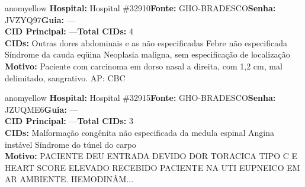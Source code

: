 \documentclass[a4paper,10pt]{article}
\begin{document}
\begin{anomalycard}[Interna\c{c}\~{a}o \#118565 | Pac. \#98367 | MODERADO (z=2.42) | LOS: 2d | 23/02/2026\,$\to$\,25/02/2026]{anomyellow}
\textbf{Hospital:} Hospital \#32910\quad \textbf{Fonte:} GHO-BRADESCO\quad \textbf{Senha:} JVZYQ97\quad \textbf{Guia:} ---\\

\textbf{CID Principal:} {\small ---}\quad\textbf{Total CIDs:} 4\\

\textbf{CIDs:} {\scriptsize Outras dores abdominais e as não especificadas \textbar{} Febre não especificada \textbar{} Síndrome da cauda eqüina \textbar{} Neoplasia maligna, sem especificação de localização}\\

\textbf{Motivo:} {\scriptsize Paciente com carcinoma em dorso nasal a direita, com 1,2 cm, mal delimitado, sangrativo. AP: CBC}\\



\end{anomalycard}


\begin{anomalycard}[Interna\c{c}\~{a}o \#119125 | Pac. \#98791 | MODERADO (z=2.41) | LOS: 2d | 01/03/2026\,$\to$\,03/03/2026]{anomyellow}
\textbf{Hospital:} Hospital \#32915\quad \textbf{Fonte:} GHO-BRADESCO\quad \textbf{Senha:} JZUQME6\quad \textbf{Guia:} ---\\

\textbf{CID Principal:} {\small ---}\quad\textbf{Total CIDs:} 3\\

\textbf{CIDs:} {\scriptsize Malformação congênita não especificada da medula espinal \textbar{} Angina instável \textbar{} Síndrome do túnel do carpo}\\

\textbf{Motivo:} {\scriptsize PACIENTE DEU ENTRADA DEVIDO DOR TORACICA TIPO C E HEART SCORE ELEVADO RECEBIDO PACIENTE NA UTI EUPNEICO EM AR AMBIENTE. HEMODINÂM...}\\



\end{anomalycard}
\end{document}
